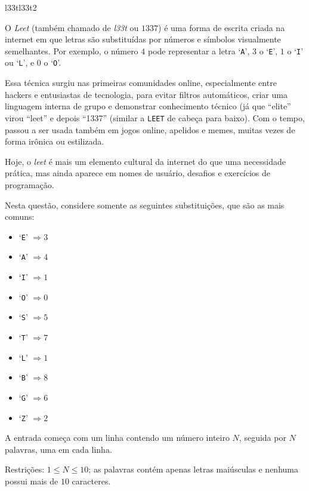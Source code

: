 \documentclass[12pt,a4paper,oneside]{article}
\begin{document}
\begin{problem}{l33t}{l33t}{2}

\begingroup
\setlength{\intextsep}{0pt}%

O \textit{Leet} (também chamado de \textit{l33t} ou $1337$) é uma forma de escrita criada na internet em que letras são substituídas por números e símbolos visualmente semelhantes.
Por exemplo, o número $4$ pode representar a letra `\texttt{A}', $3$ o `\texttt{E}', $1$ o `\texttt{I}' ou `\texttt{L}', e $0$ o `\texttt{O}'.

Essa técnica surgiu nas primeiras comunidades online, especialmente entre hackers e entusiastas de tecnologia,
para evitar filtros automáticos, criar uma linguagem interna de grupo e demonstrar conhecimento técnico (já que ``elite'' virou ``leet'' e depois ``1337'' (similar a \texttt{LEET} de cabeça para baixo).
Com o tempo, passou a ser usada também em jogos online, apelidos e memes, muitas vezes de forma irônica ou estilizada.

Hoje, o \textit{leet} é mais um elemento cultural da internet do que uma necessidade prática, mas ainda aparece em nomes de usuário, desafios e exercícios de programação.

Nesta questão, considere somente as seguintes substituições, que são as mais comuns:

\begin{itemize}
\item `\texttt{E}' $\Rightarrow 3$
\item `\texttt{A}' $\Rightarrow 4$
\item `\texttt{I}' $\Rightarrow 1$
\item `\texttt{O}' $\Rightarrow 0$
\item `\texttt{S}' $\Rightarrow 5$
\item `\texttt{T}' $\Rightarrow 7$
\item `\texttt{L}' $\Rightarrow 1$
\item `\texttt{B}' $\Rightarrow 8$
\item `\texttt{G}' $\Rightarrow 6$
\item `\texttt{Z}' $\Rightarrow 2$
\end{itemize}


\InputFile

A entrada começa com um linha contendo um número inteiro $N$, seguida por $N$ palavras, uma em cada linha.

Restrições: $1 \leq N \leq 10$; as palavras contém apenas letras maiúsculas e nenhuma possui mais de $10$ caracteres.


\end{problem}
\end{document}

